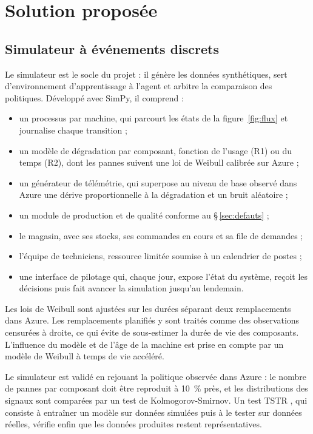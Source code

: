 \documentclass[11pt,a4paper]{article}
\newcommand{\intertitre}[1]{\par\vspace{0.3em}{\sffamily\bfseries\color{primaire}#1}\par\vspace{-0.2em}}
\begin{document}
\section{Solution proposée}

\subsection{Simulateur à événements discrets}

Le simulateur est le socle du projet : il génère les données synthétiques, sert d'environnement d'apprentissage à l'agent et arbitre la comparaison des politiques. Développé avec SimPy, il comprend :
\begin{itemize}
\item un processus par machine, qui parcourt les états de la figure~\ref{fig:flux} et journalise chaque transition ;
\item un modèle de dégradation par composant, fonction de l'usage (R1) ou du temps (R2), dont les pannes suivent une loi de Weibull calibrée sur Azure ;
\item un générateur de télémétrie, qui superpose au niveau de base observé dans Azure une dérive proportionnelle à la dégradation et un bruit aléatoire ;
\item un module de production et de qualité conforme au §\,\ref{sec:defauts} ;
\item le magasin, avec ses stocks, ses commandes en cours et sa file de demandes ;
\item l'équipe de techniciens, ressource limitée soumise à un calendrier de postes ;
\item une interface de pilotage qui, chaque jour, expose l'état du système, reçoit les décisions puis fait avancer la simulation jusqu'au lendemain.
\end{itemize}

\intertitre{Calibration et validation}
Les lois de Weibull sont ajustées sur les durées séparant deux remplacements dans Azure. Les remplacements planifiés y sont traités comme des observations censurées à droite, ce qui évite de sous-estimer la durée de vie des composants. L'influence du modèle et de l'âge de la machine est prise en compte par un modèle de Weibull à temps de vie accéléré.

Le simulateur est validé en rejouant la politique observée dans Azure : le nombre de pannes par composant doit être reproduit à 10~\% près, et les distributions des signaux sont comparées par un test de Kolmogorov-Smirnov. Un test TSTR \cite{tstr}, qui consiste à entraîner un modèle sur données simulées puis à le tester sur données réelles, vérifie enfin que les données produites restent représentatives.
\end{document}
